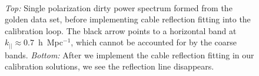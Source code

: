\documentclass[iop]{emulateapj}
\begin{document}
\begin{figure}
\begin{center}
~
\caption{
\emph{Top:} Single polarization dirty power spectrum formed from the golden data set, 
before implementing cable reflection fitting into the calibration loop. The black arrow points 
to a horizontal band at $k_{||} \approx 0.7$~h~Mpc$^{-1}$, which cannot be accounted for 
by the coarse bands. \emph{Bottom:} After we implement the cable reflection fitting in our 
calibration solutions, we see the reflection line disappears.
\label{fig:cables}
}
\end{center}
\end{figure}
\end{document}
